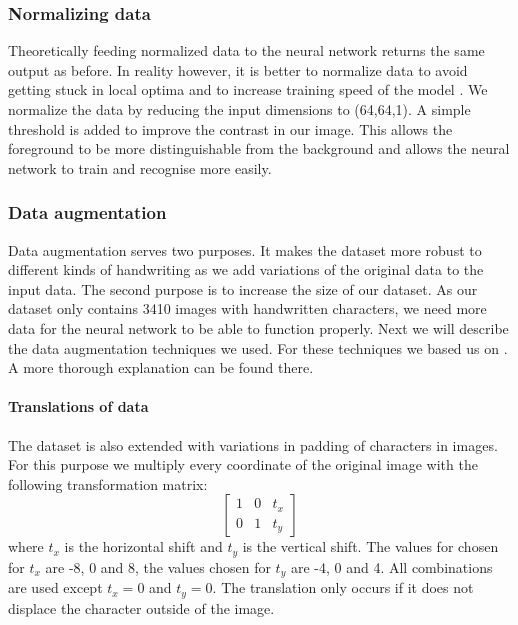 \documentclass{article}
\begin{document}
\subsubsection{Normalizing data}
\label{par:norm}
Theoretically feeding normalized data to the neural network returns the same output as before.
In reality however, it is better to normalize data to avoid getting stuck in local optima and to increase training speed of the model \cite{NormGoal}.
We normalize the data by reducing the input dimensions to (64,64,1). A simple threshold is added to improve the contrast in our image.
This allows the foreground to be more distinguishable from the background and allows the neural network to train and recognise more easily.

\subsubsection{Data augmentation}
\label{par:aug}
Data augmentation serves two purposes. It makes the dataset more robust to different kinds of handwriting as we add variations of the original data to the input data.
The second purpose is to increase the size of our dataset. As our dataset only contains 3410 images with handwritten characters, we need more data for the neural network to be able to function properly.
Next we will describe the data augmentation techniques we used. For these techniques we based us on \cite{DataAug}. A more thorough explanation can be found there.

\paragraph{Translations of data}
The dataset is also extended with variations in padding of characters in images. For this purpose we multiply every coordinate of the original image with the following transformation matrix:
\begin{equation}
        \begin{bmatrix}
                1 & 0 & t_x \\
                0 & 1 & t_y
        \end{bmatrix}
\end{equation}
where $t_x$ is the horizontal shift and $t_y$ is the vertical shift. The values for chosen for $t_x$ are -8, 0 and 8, the values chosen for $t_y$ are -4, 0 and 4. All combinations are used except $t_x=0$ and $t_y=0$. The translation only occurs if it does not displace the character outside of the image.
\end{document}
